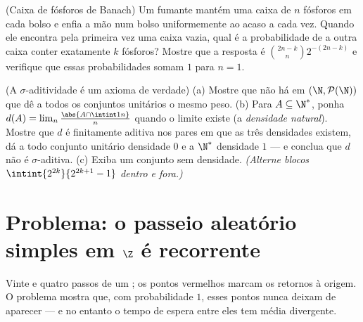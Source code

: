 \begin{exercise}[$\star\star$]\label{exo:b2:proba:11}
(Caixa de fósforos de Banach) Um fumante mantém uma caixa de $n$ fósforos em
cada bolso e enfia a mão num bolso uniformemente ao acaso a cada
vez. Quando ele encontra pela primeira vez uma caixa vazia, qual é a probabilidade
de a outra caixa conter exatamente $k$ fósforos? Mostre que a
resposta é $\binom{2n-k}{n}2^{-(2n-k)}$ e verifique que essas
probabilidades somam $1$ para $n = 1$.
\end{exercise}

\begin{exercise}[$\star\star\star$]\label{exo:b2:proba:12}
(A $\sigma$-aditividade é um axioma de verdade)
(a) Mostre que não há  em $(\N,
\mathcal P(\N))$ que dê a todos os conjuntos unitários o mesmo peso.
(b) Para $A \subseteq \N^*$, ponha $d(A) =
\lim_n\frac{\abs{A\cap\intint1n}}{n}$ quando o limite existe
(a \emph{densidade natural}). Mostre que $d$ é finitamente aditiva
nos pares em que as três densidades existem, dá a todo
conjunto unitário densidade $0$ e a $\N^*$ densidade $1$ --- e conclua
que $d$ não é $\sigma$-aditiva.
(c) Exiba um conjunto sem densidade. \emph{(Alterne blocos
$\intint{2^{2k}}{2^{2k+1}-1}$ dentro e fora.)}
\end{exercise}

\section{Problema: o passeio aleatório simples em $\Z$ é recorrente}

\begin{omfigure}

{\small Vinte e quatro passos de um ; os pontos
vermelhos marcam os retornos à origem. O problema mostra que,
com probabilidade $1$, esses pontos nunca deixam de aparecer --- e no entanto
o tempo de espera entre eles tem média divergente.}
\end{omfigure}

